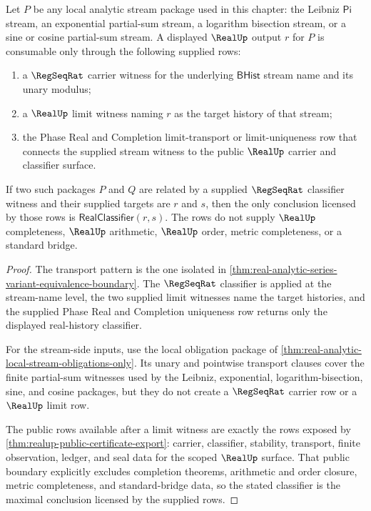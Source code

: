 \begin{theorem}
\label{thm:real-analytic-supplied-limit-consumption-boundary}
Let $P$ be any local analytic stream package used in this chapter: the Leibniz
$\mathsf{Pi}$ stream, an exponential partial-sum stream, a logarithm bisection
stream, or a sine or cosine partial-sum stream. A displayed $\RealUp$ output
$r$ for $P$ is consumable only through the following supplied rows:
\begin{enumerate}
\item a $\RegSeqRat$ carrier witness for the underlying $\mathsf{BHist}$ stream
name and its unary modulus;
\item a $\RealUp$ limit witness naming $r$ as the target history of that stream;
\item the Phase Real and Completion limit-transport or limit-uniqueness row that
connects the supplied stream witness to the public $\RealUp$ carrier and
classifier surface.
\end{enumerate}
If two such packages $P$ and $Q$ are related by a supplied $\RegSeqRat$
classifier witness and their supplied targets are $r$ and $s$, then the only
conclusion licensed by those rows is $\mathsf{RealClassifier}(r,s)$. The rows do
not supply $\RealUp$ completeness, $\RealUp$ arithmetic, $\RealUp$ order, metric
completeness, or a standard bridge.
\end{theorem}
\begin{proof}
The transport pattern is the one isolated in
\autoref{thm:real-analytic-series-variant-equivalence-boundary}. The
$\RegSeqRat$ classifier is applied at the stream-name level, the two supplied
limit witnesses name the target histories, and the supplied Phase Real and
Completion uniqueness row returns only the displayed real-history classifier.

For the stream-side inputs, use the local obligation package of
\autoref{thm:real-analytic-local-stream-obligations-only}. Its unary and
pointwise transport clauses cover the finite partial-sum witnesses used by the
Leibniz, exponential, logarithm-bisection, sine, and cosine packages, but they do
not create a $\RegSeqRat$ carrier row or a $\RealUp$ limit row.

The public rows available after a limit witness are exactly the rows exposed by
\autoref{thm:realup-public-certificate-export}: carrier, classifier, stability,
transport, finite observation, ledger, and seal data for the scoped $\RealUp$
surface. That public boundary explicitly excludes completion theorems,
arithmetic and order closure, metric completeness, and standard-bridge data, so
the stated classifier is the maximal conclusion licensed by the supplied rows.
\end{proof}

